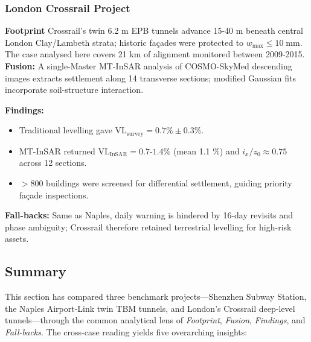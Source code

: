 \documentclass[preprint,11pt,authoryear,3p]{elsarticle}
\begin{document}
\subsubsection{London Crossrail Project}
\label{subsec:crossrail_case}

\textbf{Footprint} Crossrail's twin 6.2 m EPB tunnels advance 15-40 m beneath central
London Clay/Lambeth strata; historic façades were protected to \(w_{\max}\!\le\!10\;\mathrm{mm}\).  The case analysed here covers 21 km of alignment monitored between 2009-2015. \textbf{Fusion:} A single-Master MT-InSAR analysis of COSMO-SkyMed descending images extracts settlement along 14 transverse sections; modified Gaussian fits incorporate soil-structure interaction.

\textbf{Findings:}
\begin{itemize}
  \item Traditional levelling gave \(\mathrm{VL}_{\text{survey}} = 0.7\%\pm0.3\%\).
  \item MT-InSAR returned \(\mathrm{VL}_{\text{InSAR}} = 0.7\text{-}1.4\%\) (mean 1.1 \%) and \(i_x/z_0\approx0.75\) across 12 sections.
  \item $>$800 buildings were screened for differential settlement, guiding priority façade inspections.
\end{itemize}

\textbf{Fall-backs:} Same as Naples, daily warning is hindered by 16-day revisits and phase ambiguity; Crossrail therefore retained terrestrial levelling for high-risk assets.

\subsection{Summary}
\label{subsec:sec4_summary_en}

This section has compared three benchmark projects—Shenzhen Subway Station, the Naples Airport-Link twin TBM tunnels, and London's Crossrail deep-level tunnels—through the common analytical lens of \emph{Footprint}, \emph{Fusion}, \emph{Findings}, and \emph{Fall-backs}.  The cross-case reading yields five overarching insights:
\end{document}
